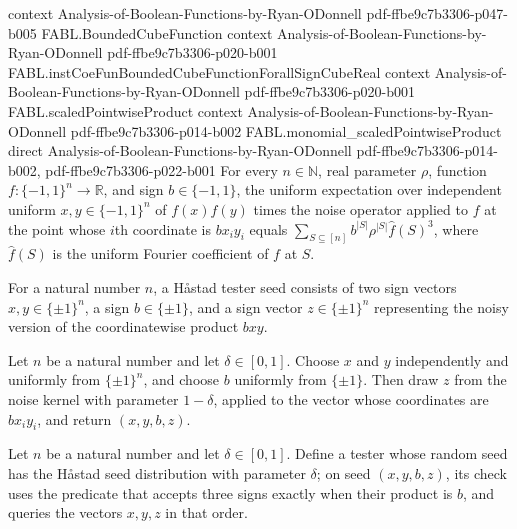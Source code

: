 \begin{theorem}
  {context}
  {Analysis-of-Boolean-Functions-by-Ryan-ODonnell}
  {pdf-ffbe9c7b3306-p047-b005}
\proofstep
  {FABL.BoundedCubeFunction}
  {context}
  {Analysis-of-Boolean-Functions-by-Ryan-ODonnell}
  {pdf-ffbe9c7b3306-p020-b001}
\proofstep
  {FABL.instCoeFunBoundedCubeFunctionForallSignCubeReal}
  {context}
  {Analysis-of-Boolean-Functions-by-Ryan-ODonnell}
  {pdf-ffbe9c7b3306-p020-b001}
\proofstep
  {FABL.scaledPointwiseProduct}
  {context}
  {Analysis-of-Boolean-Functions-by-Ryan-ODonnell}
  {pdf-ffbe9c7b3306-p014-b002}
\proofstep
  {FABL.monomial_scaledPointwiseProduct}
  {direct}
  {Analysis-of-Boolean-Functions-by-Ryan-ODonnell}
  {pdf-ffbe9c7b3306-p014-b002,
    pdf-ffbe9c7b3306-p022-b001}
For every $n\in\mathbb N$, real parameter $\rho$, function $f:\{−1,1\}^n\to\mathbb R$,
and sign $b\in\{−1,1\}$, the uniform expectation over independent uniform
$x,y\in\{−1,1\}^n$ of $f(x)f(y)$ times the noise operator applied to $f$ at the point
whose $i$th coordinate is $b x_i y_i$ equals $\sum_{S\subseteq[n]}
b^{|S|}\rho^{|S|}\widehat f(S)^3$, where $\widehat f(S)$ is the uniform Fourier
coefficient of $f$ at $S$.
\end{theorem}

\begin{definition}
\label{FABL.HastadSeed}
\leanok
{}
For a natural number $n$, a Håstad tester seed consists of two sign vectors
$x,y\in\{\pm1\}^n$, a sign $b\in\{\pm1\}$, and a sign vector $z\in\{\pm1\}^n$
representing the noisy version of the coordinatewise product $bxy$.
\end{definition}

\begin{definition}
\label{FABL.hastadSeedPMF}
\leanok
{}
Let $n$ be a natural number and let $\delta\in[0,1]$. Choose $x$ and $y$ independently
and uniformly from $\{\pm1\}^n$, and choose $b$ uniformly from $\{\pm1\}$. Then draw $z$
from the noise kernel with parameter $1-\delta$, applied to the vector whose coordinates
are $b x_i y_i$, and return $(x,y,b,z)$.
\end{definition}

\begin{definition}
\label{FABL.hastadTester}
\leanok
{}
Let $n$ be a natural number and let $\delta\in[0,1]$. Define a tester whose random seed
has the Håstad seed distribution with parameter $\delta$; on seed $(x,y,b,z)$, its check
uses the predicate that accepts three signs exactly when their product is $b$, and
queries the vectors $x,y,z$ in that order.
\end{definition}

